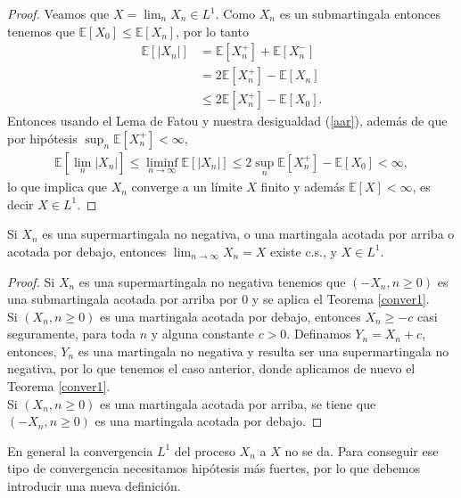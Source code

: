 \begin{proof}
Veamos que $X = \lim_n X_n \in L^1$. Como $X_n$ es un submartingala entonces tenemos que $\mathbb{E}[X_0] \leq \mathbb{E}[X_n]$, por lo tanto
	\begin{align}
	\mathbb{E}[|X_n|] & = \mathbb{E}[X_n^{+}] + \mathbb{E}[X_n^{-}] \nonumber \\
	& = 2\mathbb{E}[X_n^{+}] - \mathbb{E}[X_n] \nonumber \\
	& \leq 2\mathbb{E}[X_n^{+}] - \mathbb{E}[X_0]. \label{aar}
	\end{align}
Entonces usando el Lema de Fatou \cite[p.~205]{jacodprotter} y nuestra desigualdad (\ref{aar}), además de que por hipótesis $\sup_n \mathbb{E}[X_n^{+}] < \infty$,
	\begin{align*}
	\mathbb{E}\left[\lim_n |X_n|\right] \leq \liminf_{n \rightarrow \infty} \mathbb{E}[|X_n|] \leq 2 \sup_n \mathbb{E}[X_n^{+}] - \mathbb{E}[X_0] < \infty,
	\end{align*}
lo que implica que $X_n$ converge a un límite $X$ finito y además $\mathbb{E}[X] < \infty$, es decir $X \in L^1$.
\end{proof}

\begin{corollary}
Si $X_n$ es una supermartingala no negativa, o una martingala acotada por arriba o acotada por debajo, entonces $\lim_{n \rightarrow \infty} X_n = X$ existe c.s., y $X \in L^1$.
\end{corollary}
\begin{proof}
Si $X_n$ es una supermartingala no negativa tenemos que $(-X_n, n \geq 0)$ es una submartingala acotada por arriba por 0 y se aplica el Teorema \ref{conver1}. \\

Si $(X_n, n \geq 0)$ es una martingala acotada por debajo, entonces $X_n \geq -c$ casi seguramente, para toda $n$ y alguna constante $c > 0$. Definamos $Y_n = X_n + c$, entonces, $Y_n$ es una martingala no negativa y resulta ser una supermartingala no negativa, por lo que tenemos el caso anterior, donde aplicamos de nuevo el Teorema \ref{conver1}. \\

Si $(X_n, n \geq 0)$ es una martingala acotada por arriba, se tiene que $(-X_n, n \geq 0)$ es una martingala acotada por debajo.
\end{proof}

En general la convergencia $L^1$ del proceso $X_n$ a $X$ no se da. Para conseguir ese tipo de convergencia necesitamos hipótesis más fuertes, por lo que debemos introducir una nueva definición.

